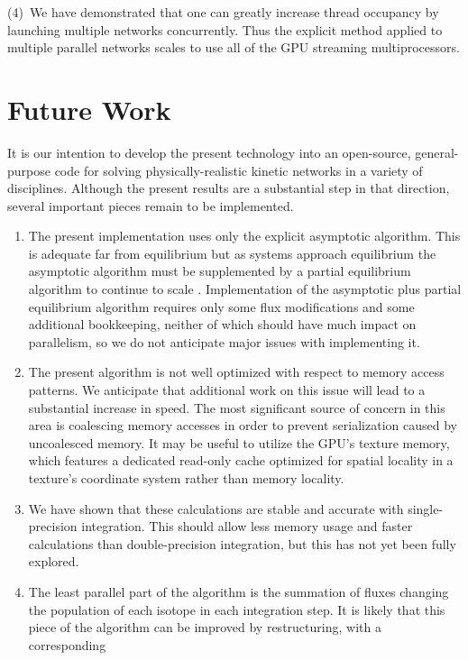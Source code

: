 \documentclass[]{elsart}
\begin{document}
(4)~We have demonstrated that one can greatly increase thread occupancy by 
launching multiple networks concurrently. Thus the explicit method applied to 
multiple parallel networks scales to use all of the GPU streaming
multiprocessors.


\section{Future Work}

It is our intention to develop the present technology into an open-source, 
general-purpose code for solving  physically-realistic kinetic networks in a 
variety of disciplines.  Although the present results are a substantial step in 
that direction,  several important pieces remain to be implemented.

\begin{enumerate}
\item 
The present implementation uses only the explicit asymptotic algorithm.  This is 
adequate far from equilibrium but as systems approach equilibrium the asymptotic 
algorithm must be supplemented by a partial equilibrium algorithm 
to continue to scale \cite{guidPE}.  Implementation of the 
asymptotic plus partial equilibrium algorithm requires only some flux 
modifications and some additional bookkeeping, neither of which should have much 
impact on parallelism, so we do not anticipate major issues with implementing 
it.
\item
The present algorithm is not well optimized with respect to memory access
patterns. We anticipate that additional work on this issue
will lead to a substantial increase in speed. The most significant source of
concern in this area is coalescing memory accesses in order to prevent serialization
caused by uncoalesced memory.  It may be useful to utilize the GPU's texture memory,
which features a dedicated read-only cache optimized for spatial locality in a texture's
coordinate system rather than memory locality.
\item
We have shown that these calculations are stable and accurate with 
single-precision integration.  This should allow less memory usage and faster 
calculations than double-precision integration, but this has not yet been fully explored.
\item
The least parallel part of the algorithm is the summation of fluxes changing the 
population of each isotope in each integration step.  It is likely that this 
piece of the algorithm can be improved by restructuring, with a corresponding 

\end{enumerate}
\end{document}
